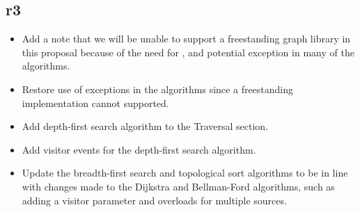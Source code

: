 \subsection*{\paperno r3}
\begin{itemize}
      \item Add a note that we will be unable to support a freestanding graph library in this proposal because
            of the need for ,  and potential  exception in many of 
            the algorithms. 
      \item Restore use of exceptions in the algorithms since a freestanding implementation cannot supported.
      \item Add depth-first search algorithm to the Traversal section.
      \item Add visitor events for the depth-first search algorithm.
      \item Update the breadth-first search and topological sort algorithms to be in line with changes made to the 
            Dijkstra and Bellman-Ford algorithms, such as adding a visitor parameter and overloads for multiple sources.
\end{itemize}

